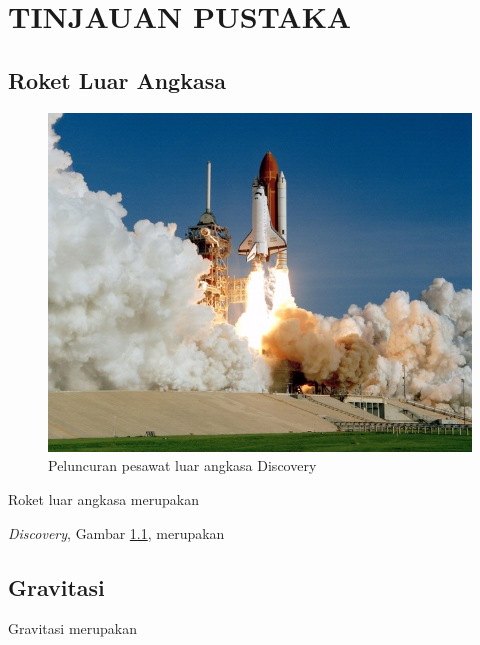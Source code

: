\chapter{TINJAUAN PUSTAKA}


\section{Roket Luar Angkasa}

\begin{figure} [ht] \centering
	\includegraphics[scale=0.3]{gambar/space-shuttle.jpg}
	\caption{Peluncuran pesawat luar angkasa Discovery \citep{DiscoverySpaceShuttle}}
	\label{fig:SpaceShuttle}
\end{figure}

Roket luar angkasa merupakan \lipsum[16][1-10]

\emph{Discovery}, Gambar \ref{fig:SpaceShuttle}, merupakan \lipsum[17][1-9]

\section{Gravitasi}

Gravitasi merupakan \lipsum[18][1-10]

